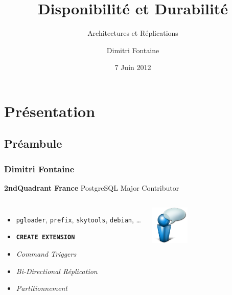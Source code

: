 \documentclass[english]{beamer}
\title{Disponibilité et Durabilité}
\subtitle{Architectures et Réplications}
\author{Dimitri Fontaine}
\date{7 Juin 2012}
\begin{document}
\frame{\titlepage}

\section{Présentation}
\subsection{Préambule}
\frame{\tableofcontents[currentsection]}

\begin{frame}[fragile]
  \frametitle{Dimitri Fontaine}

  \begin{center}
    \textbf{2ndQuadrant France}
    \linebreak
    PostgreSQL Major Contributor
  \end{center}
  \linebreak

\begin{columns}[c]

  \begin{itemize}
   \item<1-> \texttt{pgloader}, \texttt{prefix}, \texttt{skytools}, \texttt{debian}, …
   \item<1-> \texttt{\textbf{CREATE EXTENSION}}
   \item<2-> \textit{Command Triggers}
   \item<2-> \textit{Bi-Directional Réplication}
   \item<3-> \textit{Partitionnement}
  \end{itemize}  

\begin{center}
  \includegraphics[height=5em]{bulle-blue-icon.png}
\end{center}
\end{columns}
\end{frame}
\end{document}
